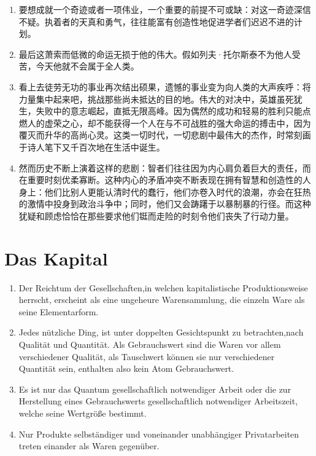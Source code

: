 \documentclass[UTF8]{ctexart}
\begin{document}
\begin{enumerate}
			\item 要想成就一个奇迹或者一项伟业，一个重要的前提不可或缺：对这一奇迹深信不疑。执着者的天真和勇气，往往能富有创造性地促进学者们迟迟不进的计划。
			
			\item 最后这萧索而低微的命运无损于他的伟大。假如列夫·托尔斯泰不为他人受苦，今天他就不会属于全人类。
			
			\item 看上去徒劳无功的事业再次结出硕果，遗憾的事业变为向人类的大声疾呼：将力量集中起来吧，挑战那些尚未抵达的目的地。伟大的对决中，英雄虽死犹生，失败中的意志崛起，直抵无限高峰。因为偶然的成功和轻易的胜利只能点燃人的虚荣之心，却不能获得一个人在与不可战胜的强大命运的搏击中，因为覆灭而升华的高尚心灵。这类一切时代，一切悲剧中最伟大的杰作，时常刻画于诗人笔下又千百次地在生活中诞生。
			
			\item 然而历史不断上演着这样的悲剧：智者们往往因为内心肩负着巨大的责任，而在重要时刻优柔寡断。这种内心的矛盾冲突不断表现在拥有智慧和创造性的人身上：他们比别人更能认清时代的蠢行，他们亦卷入时代的浪潮，亦会在狂热的激情中投身到政治斗争中；同时，他们又会踌躇于以暴制暴的行径。而这种犹疑和顾虑恰恰在那些要求他们铤而走险的时刻令他们丧失了行动力量。 
			
		\end{enumerate}
		
	
	\newpage
	
	\section{Das Kapital}
	
		
		\begin{enumerate}
			\item Der Reichtum der Gesellschaften,in welchen kapitalistische Produktionsweise herrscht, erscheint als eine ungeheure Warensammlung, die einzeln Ware als seine Elementarform.
			
			\item Jedes nützliche Ding, ist unter doppelten Gesichtspunkt zu betrachten,nach Qualität und Quantität. Als Gebrauchswert sind die Waren vor allem verschiedener Qualität, als Tauschwert können sie nur verschiedener Quantität sein, enthalten also kein Atom Gebrauchswert.
			
			\item Es ist nur das Quantum gesellschaftlich notwendiger Arbeit oder die zur Herstellung eines Gebrauchswerts gesellschaftlich notwendiger Arbeitszeit, welche seine Wertgröße bestimmt.
			
			\item Nur Produkte selbständiger und voneinander unabhängiger Privatarbeiten treten einander als Waren gegenüber.
			
		
			
		\end{enumerate}
	
\end{document}
